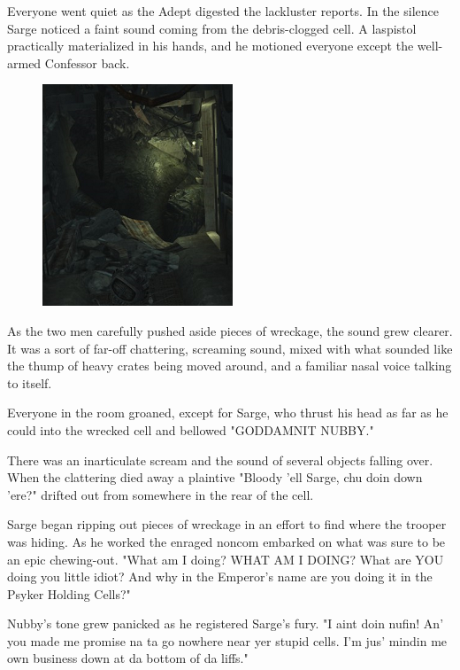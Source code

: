 Everyone went quiet as the Adept digested the lackluster reports. 
In the silence Sarge noticed a faint sound coming from the debris-clogged cell. 
A laspistol practically materialized in his hands, and he motioned everyone except the well-armed Confessor back.

\begin{figure}
	\begin{center}
		\includegraphics[width=\figwidth]{pics/12/3.png}
	\end{center}
\end{figure}
As the two men carefully pushed aside pieces of wreckage, the sound grew clearer. 
It was a sort of far-off chattering, screaming sound, mixed with what sounded like the thump of heavy crates being moved around, and a familiar nasal voice talking to itself.

Everyone in the room groaned, except for Sarge, who thrust his head as far as he could into the wrecked cell and bellowed "GODDAMNIT NUBBY."

There was an inarticulate scream and the sound of several objects falling over. 
When the clattering died away a plaintive "Bloody 'ell Sarge, chu doin down 'ere?" drifted out from somewhere in the rear of the cell.

Sarge began ripping out pieces of wreckage in an effort to find where the trooper was hiding. 
As he worked the enraged noncom embarked on what was sure to be an epic chewing-out. 
"What am I doing? 
WHAT AM I DOING? 
What are YOU doing you little idiot? 
And why in the Emperor's name are you doing it in the Psyker Holding Cells?"

Nubby's tone grew panicked as he registered Sarge's fury. 
"I aint doin nufin! 
An' you made me promise na ta go nowhere near yer stupid cells. 
I'm jus' mindin me own business down at da bottom of da liffs."

